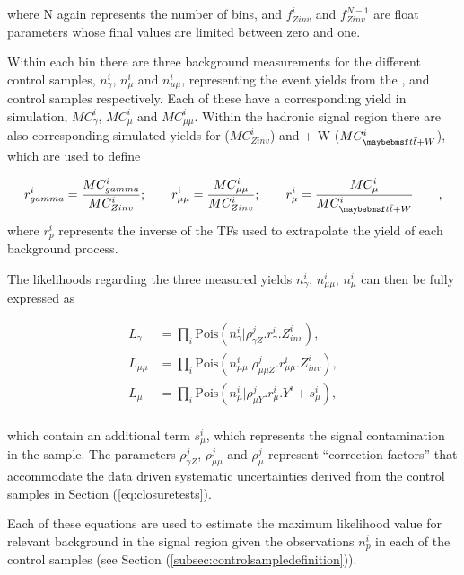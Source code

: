 where N again represents the number of \theht bins, and $f^{i}_{Zinv}$ and $f^{N-1}_{Zinv}$ are float parameters whose final values are limited between zero and one. 

Within each \theht bin there are three background measurements for the different control samples, $n^{i}_{\gamma}$, $n^{i}_{\mu}$ and $n^{i}_{\mu\mu}$, representing the event yields from the \gpjets, \mupjets and \dimupjets control samples respectively. Each of these have a corresponding yield in simulation, $MC^{i}_{\gamma}$, $MC^{i}_{\mu}$ and $MC^{i}_{\mu\mu}$.  Within the hadronic signal region there are also corresponding simulated yields for \zinv ($MC^{i}_{Zinv}$) and \ttbar + W ($MC^{i}_{\ttbar+W}$), which are used to define

\begin{equation}
r^{i}_{\gamma} = \frac{MC^{i}_{\gamma}}{MC^{i}_{Zinv}}; \qquad r^{i}_{\mu\mu} = \frac{MC^{i}_{\mu\mu}}{MC^{i}_{Zinv}}; \qquad r^{i}_{\mu} = \frac{MC^{i}_{\mu}}{MC^{i}_{\ttbar + W}} \qquad,
\end{equation}
where $r^{i}_{p}$ represents the inverse of the \ac{TF}s used to extrapolate the yield of each background process.

The likelihoods regarding the three measured yields $n^{i}_{\gamma}$, $n^{i}_{\mu\mu}$, $n^{i}_{\mu}$ can then be fully expressed as

\begin{align}
L_{\gamma} &= \prod_{i} \text{Pois} (n^{i}_{\gamma} | \rho^{j}_{\gamma Z} . r^{i}_{\gamma} . Z^{i}_{inv}), \\
L_{\mu\mu} &= \prod_{i} \text{Pois} (n^{i}_{\mu\mu} | \rho^{j}_{\mu\mu Z} . r^{i}_{\mu\mu} . Z^{i}_{inv}), \\
L_{\mu} &= \prod_{i} \text{Pois} (n^{i}_{\mu} | \rho^{j}_{\mu Y} . r^{i}_{\mu} . Y^{i} + s^{i}_{\mu}), \\
\end{align}

which contain an additional term $s^{i}_{\mu}$, which represents the signal contamination in the \mupjets sample. The parameters $\rho^{j}_{\gamma Z}$, $\rho^{j}_{\mu\mu}$ and $\rho^{j}_{\mu}$ represent ``correction factors'' that accommodate the data driven systematic uncertainties derived from the control samples in Section (\ref{eq:closuretests}). 

Each of these equations are used to estimate the maximum likelihood value for relevant background in the signal region given the observations $n^{i}_{p}$ in each of the control samples (see Section (\ref{subsec:controlsampledefinition})).

